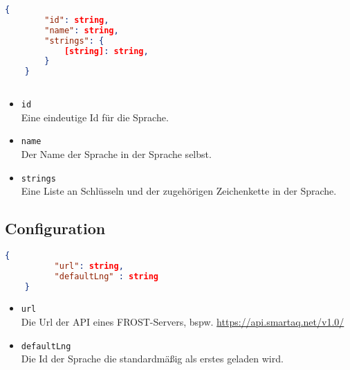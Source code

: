 \begin{lstlisting}[language=json,firstnumber=1]
	{
		"id": string,
		"name": string,
		"strings": {
			[string]: string,
		}
	}
	
\end{lstlisting}

\begin{itemize}
	\item \texttt{id} 
	\\ Eine eindeutige Id für die Sprache.
	\item \texttt{name} 
	\\ Der Name der Sprache in der Sprache selbst.
	\item \texttt{strings} 
	\\ Eine Liste an Schlüsseln und der zugehörigen Zeichenkette in der Sprache.
\end{itemize}

\subsection{Configuration}

\begin{lstlisting}[language=json, firstnumber=1]
	{
		  "url": string,
		  "defaultLng" : string
	}

\end{lstlisting}

\begin{itemize}
	\item \texttt{url}
	\\ Die Url der API eines FROST-Servers, bspw. \url{https://api.smartaq.net/v1.0/}
	\item \texttt{defaultLng}
	\\ Die Id der Sprache die standardmäßig als erstes geladen wird.
\end{itemize}